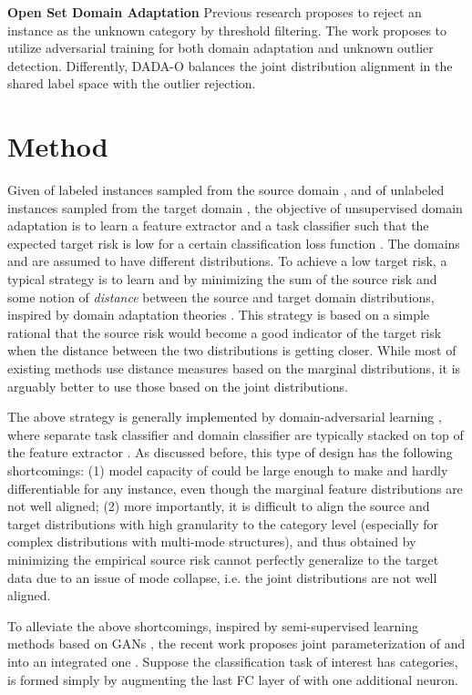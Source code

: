 \documentclass[letterpaper]{article} \usepackage{aaai20}  \usepackage{times}  \usepackage{helvet} \usepackage{courier}  \usepackage[hyphens]{url}  \usepackage{graphicx} \urlstyle{rm} \def\UrlFont{\rm}  \usepackage{graphicx}  \frenchspacing  \setlength{\pdfpagewidth}{8.5in}  \setlength{\pdfpageheight}{11in}
\begin{document}
\noindent\textbf{Open Set Domain Adaptation} Previous research \cite{open_set_svm} proposes to reject an instance as the unknown category by threshold filtering. The work \cite{bp_for_os} proposes to utilize adversarial training for both domain adaptation and unknown outlier detection. Differently, DADA-O balances the joint distribution alignment in the shared label space with the outlier rejection.

\section{Method}
Given  of labeled instances sampled from the source domain , and  of unlabeled instances sampled from the target domain , the objective of unsupervised domain adaptation is to learn a feature extractor  and a task classifier  such that the expected target risk  is low for a certain classification loss function . The domains  and  are assumed to have different distributions. To achieve a low target risk, a typical strategy is to learn  and  by minimizing the sum of the source risk and some notion of \emph{distance} between the source and target domain distributions, inspired by domain adaptation theories \cite{da_theory1,da_theory2}. This strategy is based on a simple rational that the source risk would become a good indicator of the target risk when the distance between the two distributions is getting closer. While most of existing methods use distance measures based on the marginal distributions, it is arguably better to use those based on the joint distributions.

The above strategy is generally implemented by domain-adversarial learning \cite{dann,tada}, where separate task classifier  and domain classifier  are typically stacked on top of the feature extractor .  As discussed before, this type of design has the following shortcomings: (1) model capacity of  could be large enough to make  and  hardly differentiable for any instance, even though the marginal feature distributions are not well aligned; (2) more importantly, it is difficult to align the source and target distributions with high granularity to the category level (especially for complex distributions with multi-mode structures), and thus  obtained by minimizing the empirical source risk cannot perfectly generalize to the target data due to an issue of mode collapse, i.e. the joint distributions are not well aligned.

To alleviate the above shortcomings, inspired by semi-supervised learning methods based on GANs \cite{gan_tech1,gan_tech2}, the recent work \cite{dann_ca} proposes joint parameterization of  and  into an integrated one . Suppose the classification task of interest has  categories,  is formed simply by augmenting the last FC layer of  with one additional neuron. 
\end{document}
